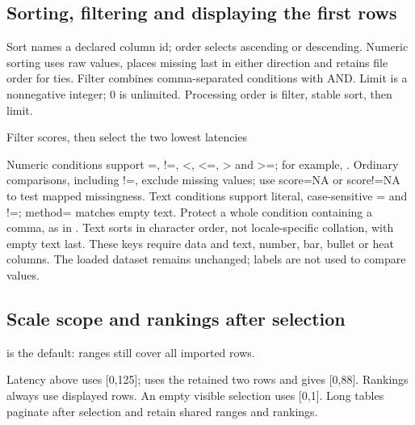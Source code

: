 \subsection{Sorting, filtering and displaying the first rows}
Sort names a declared column id; order selects ascending or descending. Numeric
sorting uses raw values, places missing last in either direction and retains
file order for ties. Filter combines comma-separated conditions with AND. Limit
is a nonnegative integer; 0 is unlimited. Processing order is filter, stable sort,
then limit.
\begin{demo}{Filter scores, then select the two lowest latencies}
\begin{center}
\begin{gradtable}[align=c,header align=c,data=results,width=\linewidth,scale=column,
  filter={score>=75},sort=time,order=ascending,limit=2]
\end{gradtable}
\end{center}
\end{demo}
Numeric conditions support =, !=, <, <=, > and >=; for example,
. Ordinary comparisons, including !=, exclude missing
values; use score=NA or score!=NA to test mapped missingness. Text conditions
support literal, case-sensitive = and !=; method= matches empty text. Protect a
whole condition containing a comma, as in .
Text sorts in character order, not locale-specific collation, with empty text
last. These keys require data and text, number, bar, bullet or heat columns.
The loaded dataset remains unchanged; labels are not used to compare values.
\subsection{Scale scope and rankings after selection}
 is the default: ranges still cover all imported rows.

Latency above uses [0,125];  uses the retained two rows and
gives [0,88]. Rankings always use displayed rows. An empty visible selection uses
[0,1]. Long tables paginate after selection and retain shared ranges and rankings.


